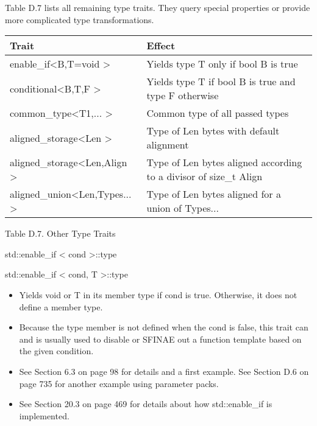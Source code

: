 

Table D.7 lists all remaining type traits. They query special properties or provide more complicated type transformations.

\begin{table}[H]
	\begin{center}
	\begin{tabular}{l|l}
		\hline
		\textbf{Trait}                                       & \textbf{Effect}                                                   \\ \hline
		enable\_if\textless{}B,T=void \textgreater{}         & Yields type T only if bool B is true                              \\ \hline
		conditional\textless{}B,T,F \textgreater{}           & Yields type T if bool B is true and type F otherwise              \\ \hline
		common\_type\textless{}T1,... \textgreater{}         & Common type of all passed types                                   \\ \hline
		aligned\_storage\textless{}Len \textgreater{}        & Type of Len bytes with default alignment                          \\ \hline
		aligned\_storage\textless{}Len,Align \textgreater{}  & Type of Len bytes aligned according to a divisor of size\_t Align \\ \hline
		aligned\_union\textless{}Len,Types... \textgreater{} & Type of Len bytes aligned for a union of Types...                 \\ \hline
	\end{tabular}
	\end{center}
\end{table}

\begin{center}
Table D.7. Other Type Traits
\end{center}

std::enable\_if < cond >::type

std::enable\_if < cond, T >::type

\begin{itemize}
\item
Yields void or T in its member type if cond is true. Otherwise, it does not define a member type.

\item
Because the type member is not defined when the cond is false, this trait can and is usually used to disable or SFINAE out a function template based on the given condition.

\item
See Section 6.3 on page 98 for details and a first example. See Section D.6 on page 735 for another example using parameter packs.

\item
See Section 20.3 on page 469 for details about how std::enable\_if is implemented.
\end{itemize}

